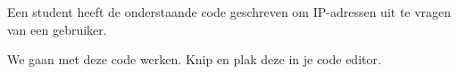 Een student heeft de onderstaande code geschreven om IP-adressen uit te vragen van een gebruiker.



We gaan met deze code werken. Knip en plak deze in je code editor.

